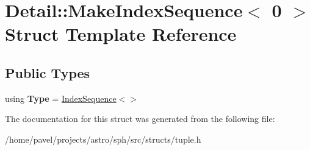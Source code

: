 \hypertarget{structDetail_1_1MakeIndexSequence_3_010_01_4}{}\section{Detail\+:\+:Make\+Index\+Sequence$<$ 0 $>$ Struct Template Reference}
\label{structDetail_1_1MakeIndexSequence_3_010_01_4}
\subsection*{Public Types}
\begin{DoxyCompactItemize}
\item 
\hypertarget{structDetail_1_1MakeIndexSequence_3_010_01_4_af69f28faad345444d89b0249c64866d8}{}\label{structDetail_1_1MakeIndexSequence_3_010_01_4_af69f28faad345444d89b0249c64866d8} 
using {\bfseries Type} = \hyperlink{structDetail_1_1IndexSequence}{Index\+Sequence}$<$$>$
\end{DoxyCompactItemize}


The documentation for this struct was generated from the following file\+:\begin{DoxyCompactItemize}
\item 
/home/pavel/projects/astro/sph/src/structs/tuple.\+h\end{DoxyCompactItemize}
